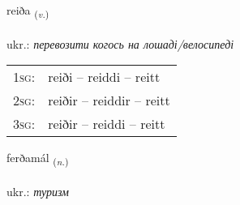 \documentclass[frontgrid, backgrid]{flacards}\usepackage[]{graphicx}\usepackage[]{xcolor}
\begin{document}
\renewcommand{\flhead}{\vskip5pt \fboxsep=0pt {\small\bfseries\footnotesize Sagnorð | дієслово}}
\renewcommand{\fcfoot}{\vskip5pt \fboxsep=0pt \hspace{2pt}{\small\bfseries\footnotesize 3K}}

\renewcommand{\blhead}{\vskip5pt {\small\bfseries\footnotesize Sagnorð | дієслово }}
\renewcommand{\bcfoot}{\vskip5pt \hspace{2pt}{\small\bfseries\footnotesize 3K}}


{reiða \small{\textsubscript{(\textit{v.})}} \\[1ex] %
\textphonetic{[reiːða]} \\
ukr.: \emph{перевозити когось на лошаді/велосипеді} \\  [2ex]
\renewcommand*{\arraystretch}{0.8}
\begin{tabular}{p{1cm}l}
\textsc{1sg}: & reiði -- reiddi -- reitt \\ 
\textsc{2sg}: & reiðir -- reiddir -- reitt \\ 
\textsc{3sg}: & reiðir -- reiddi -- reitt \\ 
\end{tabular}
}

\renewcommand{\flhead}{\vskip5pt \fboxsep=0pt {\small\bfseries\footnotesize Nafnorð | іменник}}
\renewcommand{\fcfoot}{\vskip5pt \fboxsep=0pt \hspace{2pt}{\small\bfseries\footnotesize 3K}}

\renewcommand{\blhead}{\vskip5pt {\small\bfseries\footnotesize Nafnorð | іменник }}
\renewcommand{\bcfoot}{\vskip5pt \hspace{2pt}{\small\bfseries\footnotesize 3K}}


{ferðamál \small{\textsubscript{(\textit{n.})}} \\[1ex] %
\textphonetic{[fɛrðamaul]} \\
ukr.: \emph{туризм} \\  [2ex]
\renewcommand*{\arraystretch}{0.8}
}
\end{document}
